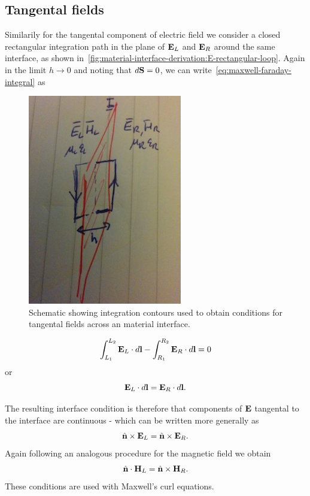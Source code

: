 \subsection{Tangental fields}

Similarily for the tangental component of electric field we consider a closed
rectangular integration path in the plane of $\mathbf{E}_L$ and $\mathbf{E}_R$ around the same
interface, as shown
in~\eqref{fig:material-interface-derivation:E-rectangular-loop}. Again in the
limit $h \to 0$ and noting that $d\mathbf{S} = 0$, we can
write~\eqref{eq:maxwell-faraday-integral} as
\begin{figure}[htbp!]
  \begin{center}
    \includegraphics[height=0.3\textheight]{Figures/Chapters/PhysicalProblem/interfaceContour}
  \end{center}
  \caption{Schematic showing integration contours used to obtain conditions for
    tangental fields across an material interface.}
  \label{fig:material-interface-derivation:E-rectangular-loop}
\end{figure}
\begin{equation}
  \label{eq:material-interfaces-tangentalcondition-E}
  \int_{L_1}^{L_2} \mathbf{E}_L \cdot d\mathbf{l} - \int_{R_1}^{R_2} \mathbf{E}_R \cdot d \mathbf{l} = 0
\end{equation}
or
$$
\mathbf{E}_L \cdot d\mathbf{l} = \mathbf{E}_R \cdot d \mathbf{l} .
$$

The resulting interface condition is therefore that components of $\mathbf{E}$ tangental
to the interface are continuous - which can be written more generally as
$$
\hat{\mathbf{n}} \times \mathbf{E}_L = \hat{\mathbf{n}} \times \mathbf{E}_R .
$$
Again following an analogous procedure for the magnetic field we obtain
$$
\hat{\mathbf{n}} \cdot \mathbf{H}_L = \hat{\mathbf{n}} \times \mathbf{H}_R .
$$
These conditions are used with Maxwell's curl equations.

